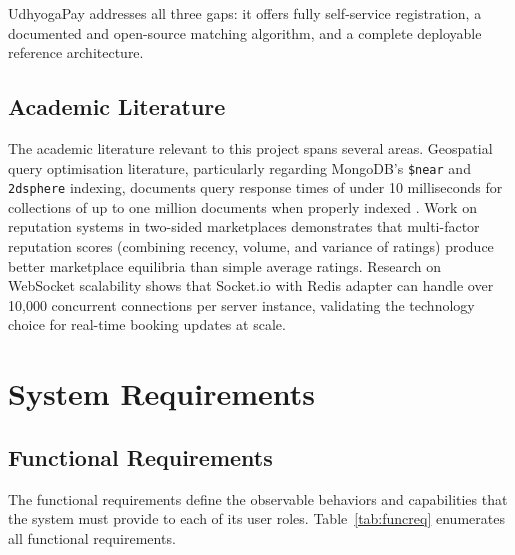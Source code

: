 \documentclass[12pt,a4paper]{report}
\begin{document}
UdhyogaPay addresses all three gaps: it offers fully self-service registration, a documented and open-source matching algorithm, and a complete deployable reference architecture.

\section{Academic Literature}

The academic literature relevant to this project spans several areas. Geospatial query optimisation literature, particularly regarding MongoDB's \texttt{\$near} and \texttt{2dsphere} indexing, documents query response times of under 10 milliseconds for collections of up to one million documents when properly indexed \cite{mongo2dsphere}. Work on reputation systems in two-sided marketplaces \cite{reputationsystems} demonstrates that multi-factor reputation scores (combining recency, volume, and variance of ratings) produce better marketplace equilibria than simple average ratings. Research on WebSocket scalability \cite{websocketscale} shows that Socket.io with Redis adapter can handle over 10,000 concurrent connections per server instance, validating the technology choice for real-time booking updates at scale.

\chapter{System Requirements}

\section{Functional Requirements}

The functional requirements define the observable behaviors and capabilities that the system must provide to each of its user roles. Table~\ref{tab:funcreq} enumerates all functional requirements.
\end{document}
